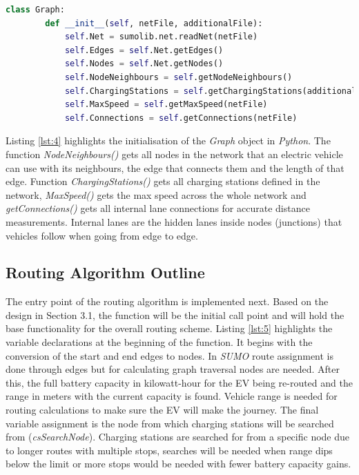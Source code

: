 \documentclass[11pt]{report}
\begin{document}
\begin{lstlisting}[language=Python, caption=Graph Python object, label={lst:4}]
    class Graph:
        def __init__(self, netFile, additionalFile):
            self.Net = sumolib.net.readNet(netFile)
            self.Edges = self.Net.getEdges()
            self.Nodes = self.Net.getNodes()
            self.NodeNeighbours = self.getNodeNeighbours()
            self.ChargingStations = self.getChargingStations(additionalFile)
            self.MaxSpeed = self.getMaxSpeed(netFile)
            self.Connections = self.getConnections(netFile)
\end{lstlisting}

Listing \ref{lst:4} highlights the initialisation of the \emph{Graph} object in \emph{Python}. The function \emph{NodeNeighbours()} gets all nodes in the network that an electric vehicle can use with its neighbours, the edge that connects them and the length of that edge. Function \emph{ChargingStations()} gets all charging stations defined in the network, \emph{MaxSpeed()} gets the max speed across the whole network and \emph{getConnections()} gets all internal lane connections for accurate distance measurements. Internal lanes are the hidden lanes inside nodes (junctions) that vehicles follow when going from edge to edge.

\subsection{Routing Algorithm Outline}

The entry point of the routing algorithm is implemented next. Based on the design in Section 3.1, the function will be the initial call point and will hold the base functionality for the overall routing scheme. Listing \ref{lst:5} highlights the variable declarations at the beginning of the function. It begins with the conversion of the start and end edges to nodes. In \emph{SUMO} route assignment is done through edges but for calculating graph traversal nodes are needed. After this, the full battery capacity in kilowatt-hour for the EV being re-routed and the range in meters with the current capacity is found. Vehicle range is needed for routing calculations to make sure the EV will make the journey. The final variable assignment is the node from which charging stations will be searched from (\emph{csSearchNode}). Charging stations are searched for from a specific node due to longer routes with multiple stops, searches will be needed when range dips below the limit or more stops would be needed with fewer battery capacity gains.
\end{document}
